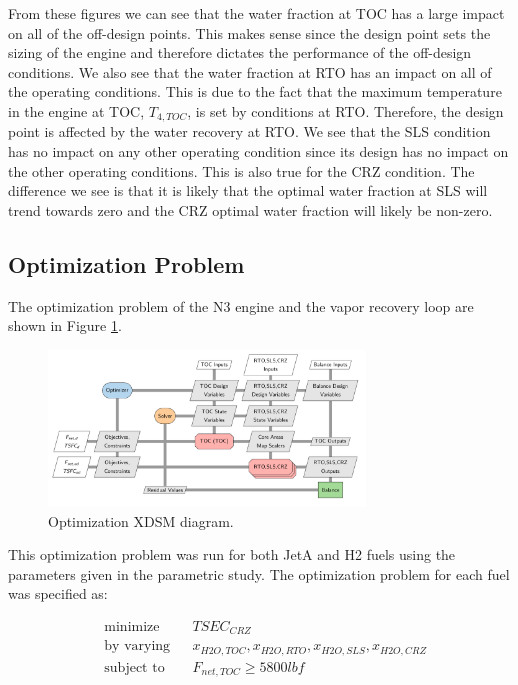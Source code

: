 \documentclass[12pt]{new-aiaa}
\begin{document}
\noindent
From these figures we can see that the water fraction at TOC has a large impact on all of the off-design points. This makes sense since the design point sets the sizing of the engine and therefore dictates the performance of the off-design conditions. We also see that the water fraction at RTO has an impact on all of the operating conditions. This is due to the fact that the maximum temperature in the engine at TOC, $T_{4,TOC}$, is set by conditions at RTO. Therefore, the design point is affected by the water recovery at RTO. We see that the SLS condition has no impact on any other operating condition since its design has no impact on the other operating conditions. This is also true for the CRZ condition. The difference we see is that it is likely that the optimal water fraction at SLS will trend towards zero and the CRZ optimal water fraction will likely be non-zero.

\subsection{Optimization Problem}
The optimization problem of the N3 engine and the vapor recovery loop are shown in Figure \ref{fig:N3_xdsm_opt}.

\begin{figure}[!hbt]
    \centering
    \includegraphics[width=0.75\textwidth]{N3_xdsm_opt.pdf}
    \caption{Optimization XDSM diagram.}
    \label{fig:N3_xdsm_opt}
\end{figure}

\noindent
This optimization problem was run for both JetA and H2 fuels using the parameters given in the parametric study.
The optimization problem for each fuel was specified as:

\begin{equation*}
    \begin{aligned}
         & {\text{minimize}}
         &                     & TSEC_{CRZ}                                         \\
         & {\text{by varying}}
         &                     & x_{H2O,TOC}, x_{H2O,RTO}, x_{H2O,SLS}, x_{H2O,CRZ} \\
         & \text{subject to}
         &                     & F_{net,TOC} \geq 5800 lbf                          \\
    \end{aligned}
\end{equation*}
\end{document}
